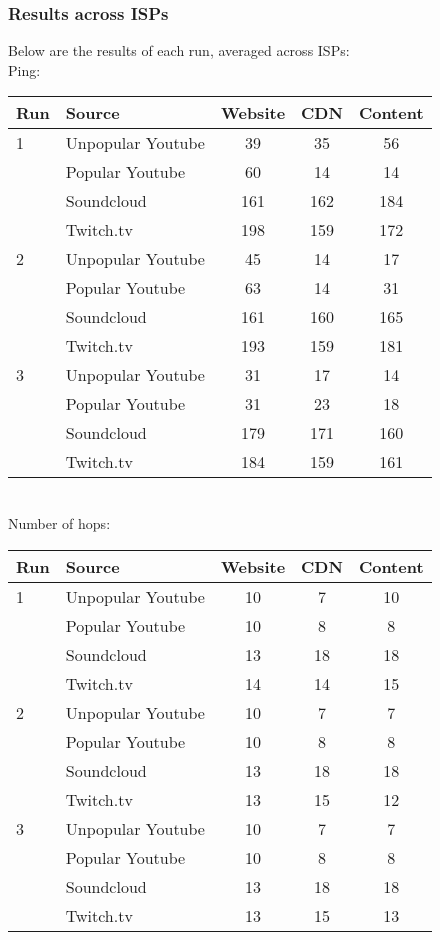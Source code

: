 \documentclass{sig-alternate-05-2015}
\begin{document}
\subsubsection{Results across ISPs}
Below are the results of each run, averaged across ISPs:
\vspace{1em} \\
Ping: \\
{\small
\begin{tabular}{|l|l|c|c|c|} \hline
Run & Source & Website & CDN & Content \\ \hline
1 & Unpopular Youtube & 39  & 35  & 56  \\ \hline
  & Popular Youtube   & 60  & 14  & 14  \\ \hline
  & Soundcloud        & 161 & 162 & 184 \\ \hline
  & Twitch.tv         & 198 & 159 & 172 \\ \hline
2 & Unpopular Youtube & 45  & 14  & 17  \\ \hline
  & Popular Youtube   & 63  & 14  & 31  \\ \hline
  & Soundcloud        & 161 & 160 & 165 \\ \hline
  & Twitch.tv         & 193 & 159 & 181 \\ \hline
3 & Unpopular Youtube & 31  & 17  & 14  \\ \hline
  & Popular Youtube   & 31  & 23  & 18  \\ \hline
  & Soundcloud        & 179 & 171 & 160 \\ \hline
  & Twitch.tv         & 184 & 159 & 161 \\ \hline
\end{tabular}}
\vspace{1em} \\
Number of hops: \\
{\small
\begin{tabular}{|l|l|c|c|c|} \hline
Run & Source & Website & CDN & Content \\ \hline
1 & Unpopular Youtube & 10 & 7  & 10 \\ \hline
  & Popular Youtube   & 10 & 8  & 8  \\ \hline
  & Soundcloud        & 13 & 18 & 18 \\ \hline
  & Twitch.tv         & 14 & 14 & 15 \\ \hline
2 & Unpopular Youtube & 10 & 7  & 7  \\ \hline
  & Popular Youtube   & 10 & 8  & 8  \\ \hline
  & Soundcloud        & 13 & 18 & 18 \\ \hline
  & Twitch.tv         & 13 & 15 & 12 \\ \hline
3 & Unpopular Youtube & 10 & 7  & 7  \\ \hline
  & Popular Youtube   & 10 & 8  & 8  \\ \hline
  & Soundcloud        & 13 & 18 & 18 \\ \hline
  & Twitch.tv         & 13 & 15 & 13 \\ \hline
\end{tabular}}
\end{document}
